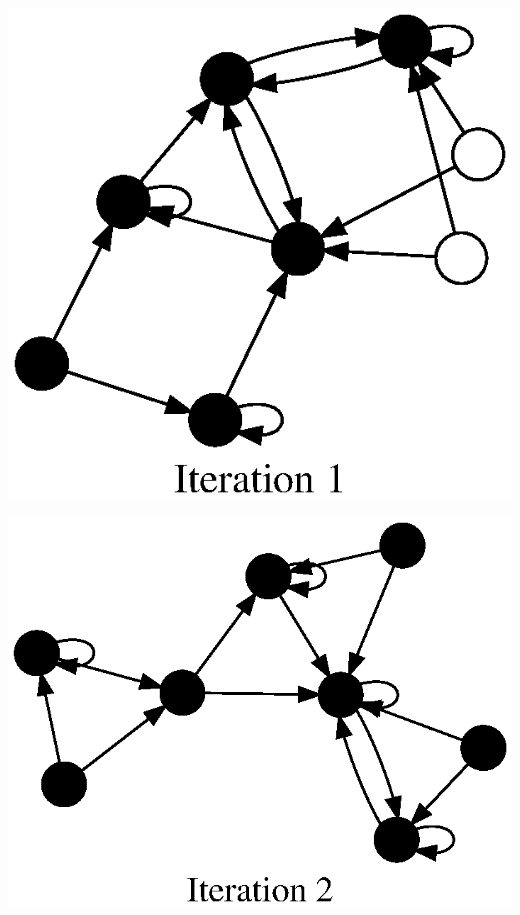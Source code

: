 \documentclass{tufte-handout}
\begin{document}
\begin{marginfigure}
\includegraphics{5iters_1.ps}
\end{marginfigure}

\begin{marginfigure}
\includegraphics{5iters_2.ps}
\end{marginfigure}
\end{document}
